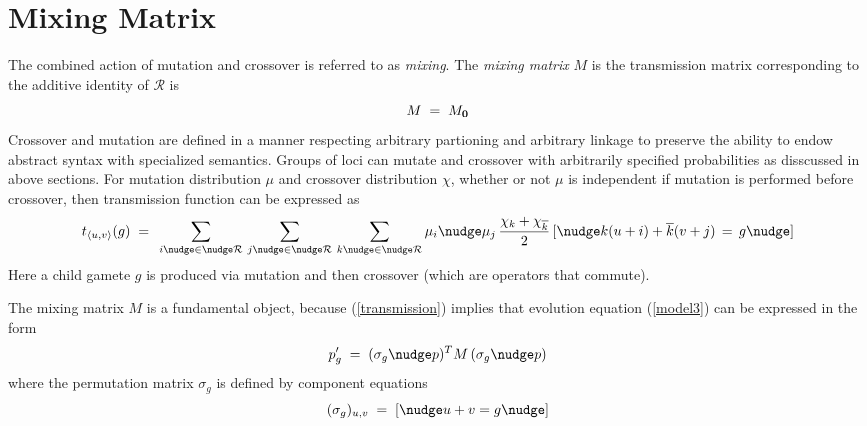 \section{Mixing Matrix}
The combined action of mutation and crossover is referred to as {\em mixing}.
The {\em mixing matrix\/} $M$ is the transmission matrix corresponding to the 
additive identity of $\mathcal{R}$ is
\[
M \; = \; M_{\bf 0}\\[-0.01in]
\]
Crossover and mutation are defined in a manner respecting arbitrary partioning and arbitrary linkage to preserve the ability to endow abstract syntax with specialized semantics. Groups of loci can mutate and crossover with arbitrarily specified probabilities as disscussed in above sections. For mutation distribution $\mu$ and crossover distribution $\chi$, whether or not $\mu$ is independent if mutation is performed before crossover, then transmission function can be expressed as \cite{Vose1999}
\begin{equation}
\label{transmission}
t_{\langle u,v \rangle}(g) \; = \;\,
\sum_{i \nudge \in \nudge \mathcal{R}} \, \sum_{j \nudge \in \nudge \mathcal{R}} \,
\sum_{k \nudge \in \nudge \mathcal{R}}
\mu_i \nudge \mu_j \, \frac{\chi_k + \chi_{\overline{k}}}{2} \,
[\nudge k (u + i) + \overline{k}(v + j) \, = \, g\nudge]
\end{equation}
Here a child gamete $g$ is produced via mutation and then crossover (which are operators that
commute). 

The mixing matrix $M$ is a fundamental object, because (\ref{transmission}) implies that evolution equation (\ref{model3}) can be expressed in the form
\begin{equation}
\label{model4}
p_g^\prime \; = \; (\sigma_g \nudge p)^T M \, (\sigma_g \nudge p)
\end{equation}
where the permutation matrix $\sigma_g$ is defined by component equations
\[
(\sigma_g)_{u,v} \; = \; [\nudge u+v = g\nudge ]
\]

